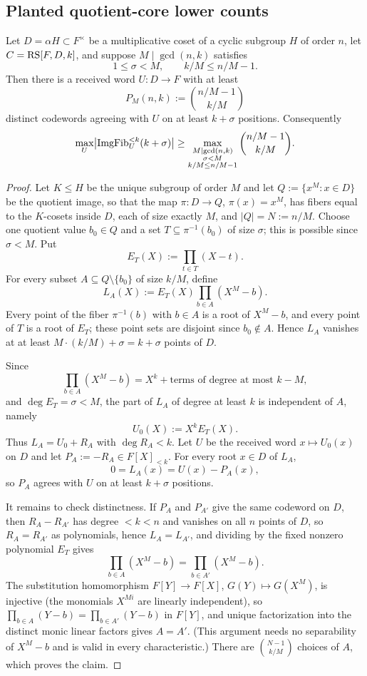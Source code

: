 \subsection{Planted quotient-core lower counts}

\begin{theorem}\label{thm:v13-planted}
Let $D=\alpha H\subset F^\times$ be a multiplicative coset of a cyclic subgroup $H$ of order $n$, let $C=\mathrm{RS}[F,D,k]$, and suppose $M\mid\gcd(n,k)$ satisfies
\[
        1\le \sigma<M,
        \qquad
        k/M\le n/M-1.
\]
Then there is a received word $U:D\to F$ with at least
\[
        P_M(n,k):=\binom{n/M-1}{k/M}
\]
distinct codewords agreeing with $U$ on at least $k+\sigma$ positions.  Consequently
\[
\max_U \bigl|\operatorname{ImgFib}_U^{<k}(k+\sigma)\bigr|
\ge
\max_{\substack{M\mid\gcd(n,k)\\ \sigma<M\\ k/M\le n/M-1}}
\binom{n/M-1}{k/M}.
\]
\end{theorem}

\begin{proof}
Let $K\le H$ be the unique subgroup of order $M$ and let $Q:=\{x^M:x\in D\}$ be the quotient image, so that the map $\pi:D\to Q$, $\pi(x)=x^M$, has fibers equal to the $K$-cosets inside $D$, each of size exactly $M$, and $|Q|=N:=n/M$.  Choose one quotient value $b_0\in Q$ and a set $T\subseteq\pi^{-1}(b_0)$ of size $\sigma$; this is possible since $\sigma<M$.  Put
\[
        E_T(X):=\prod_{t\in T}(X-t).
\]
For every subset $A\subseteq Q\setminus\{b_0\}$ of size $k/M$, define
\[
        L_A(X):=E_T(X)\prod_{b\in A}(X^M-b).
\]
Every point of the fiber $\pi^{-1}(b)$ with $b\in A$ is a root of $X^M-b$, and every point of $T$ is a root of $E_T$; these point sets are disjoint since $b_0\notin A$.  Hence $L_A$ vanishes at at least $M\cdot(k/M)+\sigma=k+\sigma$ points of $D$.

Since
\[
        \prod_{b\in A}(X^M-b)=X^k+\text{terms of degree at most }k-M,
\]
and $\deg E_T=\sigma<M$, the part of $L_A$ of degree at least $k$ is independent of $A$, namely
\[
        U_0(X):=X^kE_T(X).
\]
Thus $L_A=U_0+R_A$ with $\deg R_A<k$.  Let $U$ be the received word $x\mapsto U_0(x)$ on $D$ and let $P_A:=-R_A\in F[X]_{<k}$.  For every root $x\in D$ of $L_A$,
\[
        0=L_A(x)=U(x)-P_A(x),
\]
so $P_A$ agrees with $U$ on at least $k+\sigma$ positions.

It remains to check distinctness.  If $P_A$ and $P_{A'}$ give the same codeword on $D$, then $R_A-R_{A'}$ has degree $<k<n$ and vanishes on all $n$ points of $D$, so $R_A=R_{A'}$ as polynomials, hence $L_A=L_{A'}$, and dividing by the fixed nonzero polynomial $E_T$ gives
\[
        \prod_{b\in A}(X^M-b)=\prod_{b\in A'}(X^M-b).
\]
The substitution homomorphism $F[Y]\to F[X]$, $G(Y)\mapsto G(X^M)$, is injective \textup(the monomials $X^{Mi}$ are linearly independent\textup), so $\prod_{b\in A}(Y-b)=\prod_{b\in A'}(Y-b)$ in $F[Y]$, and unique factorization into the distinct monic linear factors gives $A=A'$.  \textup(This argument needs no separability of $X^M-b$ and is valid in every characteristic.\textup)  There are $\binom{N-1}{k/M}$ choices of $A$, which proves the claim.
\end{proof}

